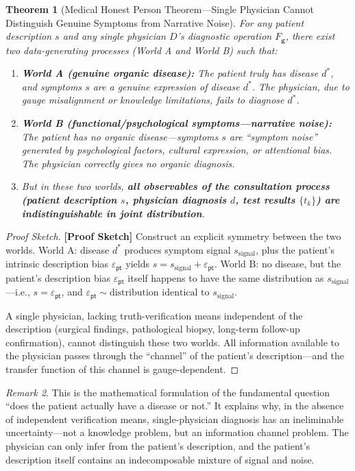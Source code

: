 \documentclass[12pt,a4paper]{article}
\newtheorem{theorem}{Theorem}[section]
\theoremstyle{remark}
\newtheorem{remark}[theorem]{Remark}
\newcommand{\pt}{\textsf{pt}}
\newcommand{\rigorSketch}{\textnormal{\textbf{[Proof Sketch]}}}
\begin{document}
\begin{theorem}[Medical Honest Person Theorem---Single Physician Cannot Distinguish Genuine Symptoms from Narrative Noise]\label{thm:honest_medical}
For any patient description $s$ and any single physician $D$'s diagnostic operation $F_{\mathbf{g}}$, there exist two data-generating processes (World A and World B) such that:
\begin{enumerate}[label=(\roman*)]
    \item \textbf{World A (genuine organic disease):} The patient truly has disease $d^*$, and symptoms $s$ are a genuine expression of disease $d^*$. The physician, due to gauge misalignment or knowledge limitations, fails to diagnose $d^*$.
    \item \textbf{World B (functional/psychological symptoms---narrative noise):} The patient has no organic disease---symptoms $s$ are ``symptom noise'' generated by psychological factors, cultural expression, or attentional bias. The physician correctly gives no organic diagnosis.
    \item But in these two worlds, \textbf{all observables of the consultation process (patient description $s$, physician diagnosis $d$, test results $\{t_k\}$) are indistinguishable in joint distribution}.
\end{enumerate}
\end{theorem}

\begin{proof}[Proof Sketch]\rigorSketch
Construct an explicit symmetry between the two worlds. World A: disease $d^*$ produces symptom signal $s_{\text{signal}}$, plus the patient's intrinsic description bias $\varepsilon_{\pt}$ yields $s = s_{\text{signal}} + \varepsilon_{\pt}$. World B: no disease, but the patient's description bias $\varepsilon_{\pt}$ itself happens to have the same distribution as $s_{\text{signal}}$---i.e., $s = \varepsilon_{\pt}$, and $\varepsilon_{\pt} \sim \text{distribution identical to } s_{\text{signal}}$.

A single physician, lacking truth-verification means independent of the description (surgical findings, pathological biopsy, long-term follow-up confirmation), cannot distinguish these two worlds. All information available to the physician passes through the ``channel'' of the patient's description---and the transfer function of this channel is gauge-dependent.
\end{proof}

\begin{remark}
This is the mathematical formulation of the fundamental question ``does the patient actually have a disease or not.'' It explains why, in the absence of independent verification means, single-physician diagnosis has an ineliminable uncertainty---not a knowledge problem, but an information channel problem. The physician can only infer from the patient's description, and the patient's description itself contains an indecomposable mixture of signal and noise.
\end{remark}
\end{document}
